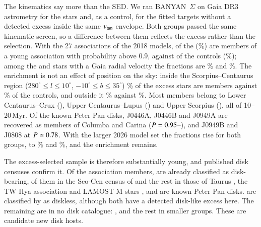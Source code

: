 \documentclass{aa}
\begin{document}
The kinematics say more than the SED. We ran BANYAN~$\Sigma$ \citep{gagne2018}
on Gaia DR3 astrometry \citep{gaia2023} for the \svPool{} stars and, as a control, for
the \banCtlN{} fitted targets without a detected excess inside the same $v_{\rm tan}$
envelope. Both groups passed the same kinematic screen, so a difference between
them reflects the excess rather than the selection. With the 27 associations of
the 2018 models, \banPoolMem{} of the \svPool{} (\banPoolPct\%) are members of a young association with
probability above 0.9, against \banCtlMem{} of the \banCtlN{} controls (\banCtlPct\%); among the \banPoolRvN{} and \banCtlRvN{}
stars with a Gaia radial velocity the fractions are \banPoolRvPct\% and \banCtlRvPct\%. The enrichment
is not an effect of position on the sky: inside the Scorpius--Centaurus region
($280^\circ \le l \le 10^\circ$, $-10^\circ \le b \le 35^\circ$) \banPoolScoPct\% of the
excess stars are members against \banCtlScoPct\% of the controls, and outside it \banPoolOutPct\%
against \banCtlOutPct\%. Most members belong to Lower Centaurus--Crux (\banLCC), Upper
Centaurus--Lupus (\banUCL) and Upper Scorpius (\banUSCO), all of 10--20\,Myr. Of the known
Peter Pan disks, J0446A, J0446B and J0949A are recovered as members of Columba
and Carina ($P = 0.95$--\banPPhiMax), and J0949B and J0808 at $P \simeq 0.78$. With the
larger 2026 model set the fractions rise for both groups, to \banPoolPctTwo\% and \banCtlPctTwo\%, and
the enrichment remains.

The excess-selected sample is therefore substantially young, and published
disk censuses confirm it. Of the \xmMembers{} association members, \xmDiskBearing{} are already
classified as disk-bearing, \xmLtwotwo{} of them in the Sco-Cen census of
\citet{luhman2022b} and the rest in those of Taurus \citep{esplin2019}, the TW Hya
association \citep{luhman2023} and LAMOST M stars \citep{wang2025}, and \xmKnownPP{}
are known Peter Pan disks. \xmDiskless{} are classified by \citet{luhman2022b} as diskless,
although both have a detected disk-like excess here. The remaining \xmNew{} are in no
disk catalogue: \xmNewByGroup, and the rest
in smaller groups. These are candidate new disk hosts.
\end{document}
